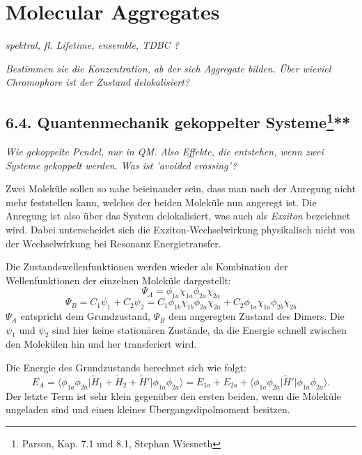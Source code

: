 

\chapter{Molecular Aggregates}

\textit{spektral, fl. Lifetime, ensemble, TDBC ?
}

\textit{Bestimmen sie die Konzentration, ab der sich Aggregate bilden. Über wieviel Chromophore ist der Zustand delokalisiert?}


\section{6.4. Quantenmechanik gekoppelter Systeme\protect\footnote{Parson, Kap. 7.1 und 8.1, Stephan Wiesneth}\hfill ***} 

\textit{Wie gekoppelte Pendel, nur in QM. Also Effekte, die
entstehen, wenn zwei Systeme gekoppelt werden. Was ist
'avoided crossing'?}

Zwei Moleküle sollen so nahe beieinander sein, dass man nach der Anregung nicht mehr feststellen kann, welches der beiden Moleküle nun angeregt ist. Die Anregung ist also über das System delokalisiert, was auch als \textit{Exziton} bezeichnet wird. Dabei unterscheidet sich die Exziton-Wechselwirkung physikalisch nicht von der Wechselwirkung bei Resonanz Energietransfer.

Die Zustandswellenfunktionen werden wieder als Kombination der Wellenfunktionen der einzelnen Moleküle dargestellt:
\[ \Psi_A = \phi_{1a}\chi_{1a}\phi_{2a}\chi_{2a} \]
\[ \Psi_B = C_1\psi_1 + C_2\psi_2 = C_1\phi_{1b}\chi_{1b}\phi_{2a}\chi_{2a} + C_2\phi_{1a}\chi_{1a}\phi_{2b}\chi_{2b} \]
$\Psi_A$ entspricht dem Grundzustand, $\Psi_B$ dem angeregten Zustand des Dimers. Die $\psi_1$ und $\psi_2$ sind hier keine stationären Zustände, da die Energie schnell zwischen den Molekülen hin und her transferiert wird.

Die Energie des Grundzustands berechnet sich wie folgt:
\begin{equation}
    E_A = \langle\phi_{1a}\phi_{2a}\lvert\tilde{H}_1+\tilde{H}_2+\tilde{H}'\rvert\phi_{1a}\phi_{2a}\rangle = E_{1a}+E_{2a}+\langle\phi_{1a}\phi_{2a}\lvert\tilde{H}'\rvert\phi_{1a}\phi_{2a}\rangle.
\end{equation}
Der letzte Term ist sehr klein gegenüber den ersten beiden, wenn die Moleküle ungeladen sind und einen kleines Übergangsdipolmoment besitzen.

